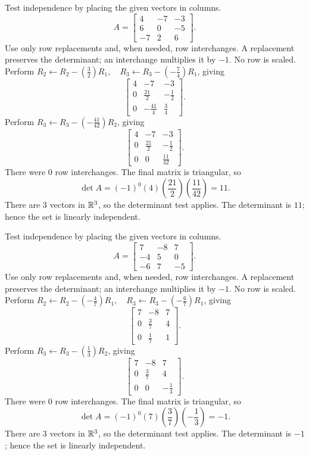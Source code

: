 \goal Test independence by placing the given vectors in columns.
\[A=\begin{bmatrix}4&-7&-3\\6&0&-5\\-7&2&6\end{bmatrix}.\]
Use only row replacements and, when needed, row interchanges. A replacement preserves the determinant; an interchange multiplies it by $-1$. No row is scaled.
Perform $R_2\leftarrow R_2-(\frac{3}{2})R_1,\quad R_3\leftarrow R_3-(- \frac{7}{4})R_1$, giving
\[
\begin{bmatrix}4&-7&-3\\0&\frac{21}{2}&- \frac{1}{2}\\0&- \frac{41}{4}&\frac{3}{4}\end{bmatrix}.
\]
Perform $R_3\leftarrow R_3-(- \frac{41}{42})R_2$, giving
\[
\begin{bmatrix}4&-7&-3\\0&\frac{21}{2}&- \frac{1}{2}\\0&0&\frac{11}{42}\end{bmatrix}.
\]
There were $0$ row interchanges. The final matrix is triangular, so
\[\det A=(-1)^{0}(4)(\frac{21}{2})(\frac{11}{42})=11.\]
There are $3$ vectors in $\mathbb{R}^3$, so the determinant test applies. The determinant is $11$; hence the set is linearly independent.

\goal Test independence by placing the given vectors in columns.
\[A=\begin{bmatrix}7&-8&7\\-4&5&0\\-6&7&-5\end{bmatrix}.\]
Use only row replacements and, when needed, row interchanges. A replacement preserves the determinant; an interchange multiplies it by $-1$. No row is scaled.
Perform $R_2\leftarrow R_2-(- \frac{4}{7})R_1,\quad R_3\leftarrow R_3-(- \frac{6}{7})R_1$, giving
\[
\begin{bmatrix}7&-8&7\\0&\frac{3}{7}&4\\0&\frac{1}{7}&1\end{bmatrix}.
\]
Perform $R_3\leftarrow R_3-(\frac{1}{3})R_2$, giving
\[
\begin{bmatrix}7&-8&7\\0&\frac{3}{7}&4\\0&0&- \frac{1}{3}\end{bmatrix}.
\]
There were $0$ row interchanges. The final matrix is triangular, so
\[\det A=(-1)^{0}(7)(\frac{3}{7})(- \frac{1}{3})=-1.\]
There are $3$ vectors in $\mathbb{R}^3$, so the determinant test applies. The determinant is $-1$; hence the set is linearly independent.

